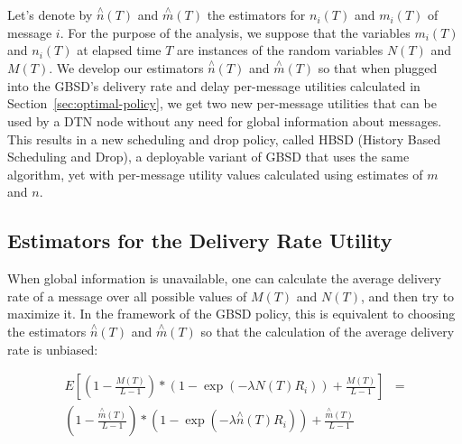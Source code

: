 
Let's denote by $\stackrel{\wedge}{n}(T)$ and
$\stackrel{\wedge}{m}(T)$ the estimators for $n_i(T)$ and $m_i(T)$ of message $i$. For the purpose of the analysis, we suppose that the variables $m_{i}(T)$ and $n_{i}(T)$ at elapsed time $T$ are instances of the random variables $N(T)$ and $M(T)$. We develop our estimators $\stackrel{\wedge}{n}(T)$ and $\stackrel{\wedge}{m}(T)$ so that when plugged into the GBSD's delivery rate and delay per-message utilities calculated in Section~\ref{sec:optimal-policy}, we get two new per-message utilities that can be used by a DTN node without any need for global information about messages. This results in a new scheduling and drop policy, called HBSD (History Based
Scheduling and Drop), a deployable variant of GBSD that uses the same algorithm, yet with per-message utility values calculated using estimates of $m$ and $n$.

\subsection{Estimators for the Delivery Rate Utility}
\label{sec:learning:EDR}

When global information is unavailable, one can calculate the
average delivery rate of a message over all possible values of
$M(T)$ and $N(T)$, and then try to maximize it. In the framework of the GBSD policy, this is equivalent to choosing the estimators $\stackrel{\wedge}{n}(T)$ and
$\stackrel{\wedge}{m}(T)$ so that the calculation of the average delivery rate is unbiased:

\begin{align*}
E[(1 - \frac{M(T)}{L-1})*(1 -\exp(-\lambda N(T) R_i
))+\frac{M(T)}{L-1}]&=
\\(1 -
\frac{\stackrel{\wedge}{m}(T)}{L-1})*(1 -\exp(-\lambda
\stackrel{\wedge}{n}(T) R_i
))+\frac{\stackrel{\wedge}{m}(T)}{L-1}
\end{align*}

